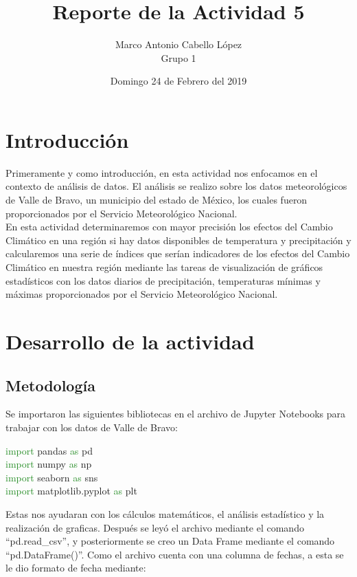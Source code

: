 \documentclass[12pt]{article}
\title{Reporte de la Actividad 5}
\author{Marco Antonio Cabello López \\ Grupo 1}
\date{Domingo 24 de Febrero del 2019}
\begin{document}
\maketitle 
\section{Introducción}
Primeramente y como introducción, en esta actividad nos enfocamos en el contexto de análisis de datos. El análisis se realizo sobre los datos meteorológicos de Valle de Bravo, un municipio del estado de México, los cuales fueron proporcionados por el Servicio Meteorológico Nacional. \\
En esta actividad determinaremos con mayor precisión los efectos del Cambio Climático en una región si hay datos disponibles de temperatura y precipitación y calcularemos una serie de índices que serían indicadores de los efectos del Cambio Climático en nuestra región mediante las tareas de visualización de gráficos estadísticos con los datos diarios de precipitación, temperaturas mínimas y máximas proporcionados por el Servicio Meteorológico Nacional.    \\

\section{Desarrollo de la actividad}
\subsection{Metodología}
Se importaron las siguientes bibliotecas en el archivo de Jupyter Notebooks para trabajar con los datos de Valle de Bravo: 

\begin{center}
\textcolor{ForestGreen} {import} pandas \textcolor{ForestGreen}{as} pd\\
\textcolor{ForestGreen} {import} numpy \textcolor{ForestGreen} {as} np\\
\textcolor{ForestGreen} {import} seaborn \textcolor{ForestGreen} {as} sns\\
\textcolor{ForestGreen} {import} matplotlib.pyplot \textcolor{ForestGreen} {as} plt\\


\end{center}Estas nos ayudaran con los cálculos matemáticos, el análisis estadístico y la realización de graficas.
Después se leyó el archivo mediante el comando “pd.read\_csv”, y posteriormente se creo un Data Frame mediante el comando “pd.DataFrame()”.
Como el archivo cuenta con una columna de fechas, a esta se le dio formato de fecha mediante:
\end{document}
